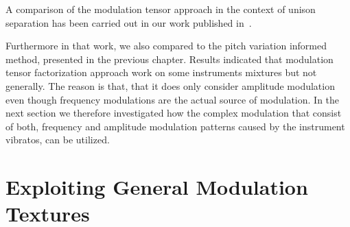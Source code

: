 {{%
%

A comparison of the modulation tensor approach in the context of unison separation has been carried out in our work published in~\cite{stoeter14}.

Furthermore in that work, we also compared to the pitch variation informed method, presented in the previous chapter.
Results indicated that modulation tensor factorization approach work on some instruments mixtures but not generally.
The reason is that, that it does only consider amplitude modulation even though frequency modulations are the actual source of modulation.
In the next section we therefore investigated how the complex modulation that consist of both, frequency and amplitude modulation patterns caused by the instrument vibratos, can be utilized.

\section{Exploiting General Modulation Textures}


}}
